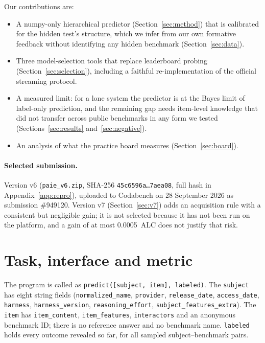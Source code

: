 \documentclass{article}
\begin{document}
Our contributions are:
\begin{itemize}
  \item A numpy-only hierarchical predictor (Section~\ref{sec:method}) that is calibrated for the hidden test's structure, which we
        infer from our own formative feedback without identifying any hidden benchmark (Section~\ref{sec:data}).
  \item Three model-selection tools that replace leaderboard probing (Section~\ref{sec:selection}), including a faithful
        re-implementation of the official streaming protocol.
  \item A measured limit: for a lone system the predictor is at the Bayes limit of label-only prediction, and the remaining gap needs
        item-level knowledge that did not transfer across public benchmarks in any form we tested (Sections~\ref{sec:results}
        and~\ref{sec:negative}).
  \item An analysis of what the practice board measures (Section~\ref{sec:board}).
\end{itemize}

\paragraph{Selected submission.} Version v6 (\texttt{paie\_v6.zip}, SHA-256
\texttt{45c6596a\ldots 7aea08}, full hash in Appendix~\ref{app:repro}), uploaded to Codabench on 28 September 2026 as submission \#949120. Version v7 (Section~\ref{sec:v7}) adds an acquisition rule with a consistent but
negligible gain; it is not selected because it has not been run on the platform, and a gain of at most 0.0005~ALC does not
justify that risk.

\section{Task, interface and metric}
\label{sec:task}

The program is called as \texttt{predict([subject, item], labeled)}. The \texttt{subject} has eight string fields
(\texttt{normalized\_name}, \texttt{provider}, \texttt{release\_date}, \texttt{access\_date}, \texttt{harness},
\texttt{harness\_version}, \texttt{reasoning\_effort}, \texttt{subject\_features\_extra}). The \texttt{item} has
\texttt{item\_content}, \texttt{item\_features}, \texttt{interactors} and an anonymous benchmark ID; there is no reference answer and no
benchmark name. \texttt{labeled} holds every outcome revealed so far, for all sampled subject--benchmark pairs.
\end{document}
